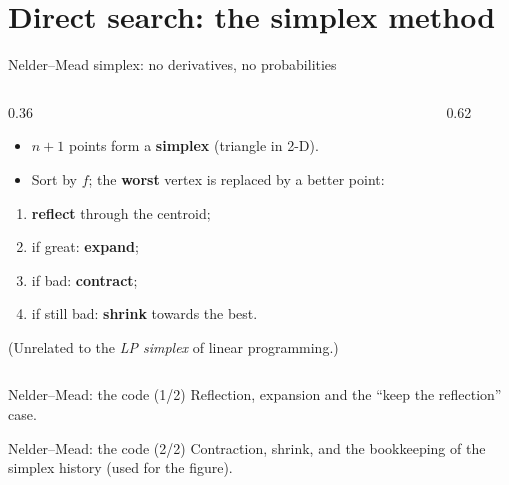 \section{Direct search: the simplex method}

\begin{frame}{Nelder--Mead simplex: no derivatives, no probabilities}
  \begin{columns}[T]
    \begin{column}{0.36\textwidth}
      \small
      \begin{itemize}
        \item $n+1$ points form a \textbf{simplex} (triangle in 2-D).
        \item Sort by $f$; the \textbf{worst} vertex is replaced by a better point:
      \end{itemize}
      \begin{enumerate}
        \item \textbf{reflect} through the centroid;
        \item if great: \textbf{expand};
        \item if bad: \textbf{contract};
        \item if still bad: \textbf{shrink} towards the best.
      \end{enumerate}
      \footnotesize (Unrelated to the \emph{LP simplex} of linear programming.)
    \end{column}
    \begin{column}{0.62\textwidth}
    \end{column}
  \end{columns}
\end{frame}

\begin{frame}{Nelder--Mead: the code (1/2)}
  \small Reflection, expansion and the ``keep the reflection'' case.
\end{frame}

\begin{frame}{Nelder--Mead: the code (2/2)}
  \small Contraction, shrink, and the bookkeeping of the simplex history (used for the figure).
\end{frame}

